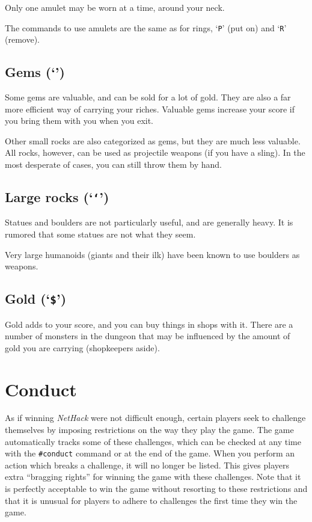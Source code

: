 Only one amulet may be worn at a time, around your neck.

The commands to use amulets are the same as for rings, `{\tt P}' (put on)
and `{\tt R}' (remove).
\subsection*{Gems (`{\tt *}')}


Some gems are valuable, and can be sold for a lot of gold.  They are also
a far more efficient way of carrying your riches.  Valuable gems increase
your score if you bring them with you when you exit.

Other small rocks are also categorized as gems, but they are much less
valuable.  All rocks, however, can be used as projectile weapons (if you
have a sling).  In the most desperate of cases, you can still throw them
by hand.
\subsection*{Large rocks (`{\tt `}')}


Statues and boulders are not particularly useful, and are generally
heavy.  It is rumored that some statues are not what they seem.

Very large humanoids (giants and their ilk) have been known to use boulders
as weapons.
\subsection*{Gold (`{\tt \$}')}


Gold adds to your score, and you can buy things in shops with it.
There are a number
of monsters in the dungeon that may be influenced by the amount of gold
you are carrying (shopkeepers aside).

\section{Conduct}

As if winning {\it NetHack\/} were not difficult enough, certain players
seek to challenge themselves by imposing restrictions on the
way they play the game.  The game automatically tracks some of
these challenges, which can be checked at any time with the {\tt \#conduct}
command or at the end of the game.  When you perform an action which
breaks a challenge, it will no longer be listed.  This gives
players extra ``bragging rights'' for winning the game with these
challenges.  Note that it is perfectly acceptable to win the game
without resorting to these restrictions and that it is unusual for
players to adhere to challenges the first time they win the game.

